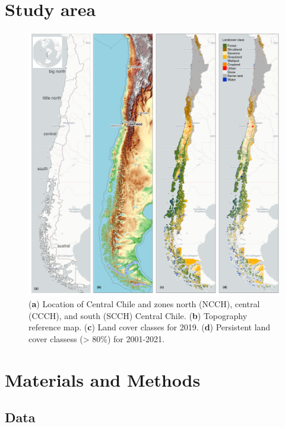 \documentclass[preprint,
3p]{elsarticle} %
\begin{document}
\hypertarget{study-area}{%
\section{Study area}\label{study-area}}

\begin{figure}[!ht]
\centering
\includegraphics[width=\textwidth]{../output/figs/map_study_con_landcover.png}
\caption{ (\textbf{a}) Location of Central Chile and zones north (NCCH), central (CCCH), and south (SCCH) Central Chile. (\textbf{b}) Topography reference map. (\textbf{c}) Land cover classes for 2019. (\textbf{d}) Persistent land cover classess (> 80\%) for 2001-2021.}
\end{figure}

\hypertarget{materials-and-methods}{%
\section{Materials and Methods}\label{materials-and-methods}}

\hypertarget{data}{%
\subsection{Data}\label{data}}
\end{document}
